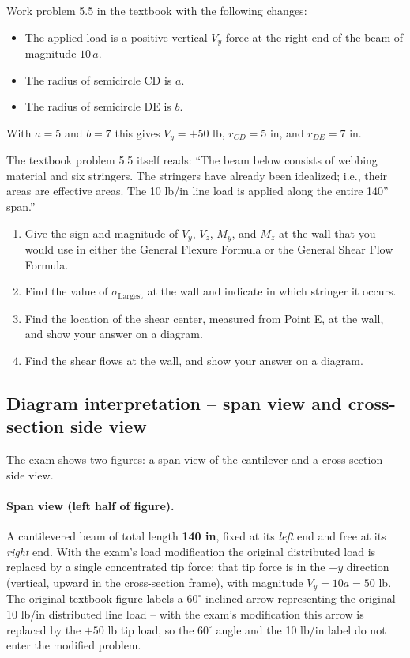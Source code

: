 \documentclass[11pt]{article}
\begin{document}
\begin{problembox}
Work problem 5.5 in the textbook with the following changes:
\begin{itemize}[leftmargin=2em, itemsep=2pt]
  \item The applied load is a positive vertical $V_y$ force at the right end of the beam of magnitude $10\,a$.
  \item The radius of semicircle CD is $a$.
  \item The radius of semicircle DE is $b$.
\end{itemize}
With $a = 5$ and $b = 7$ this gives $V_y = +50$ lb, $r_{CD} = 5$ in, and $r_{DE} = 7$ in.

The textbook problem 5.5 itself reads: ``The beam below consists of webbing material and six stringers. The stringers have already been idealized; i.e., their areas are effective areas. The 10 lb/in line load is applied along the entire 140'' span.''
\begin{enumerate}[label=(\alph*), leftmargin=2em, itemsep=2pt]
  \item Give the sign and magnitude of $V_y$, $V_z$, $M_y$, and $M_z$ at the wall that you would use in either the General Flexure Formula or the General Shear Flow Formula.
  \item Find the value of $\sigma_{\text{Largest}}$ at the wall and indicate in which stringer it occurs.
  \item Find the location of the shear center, measured from Point E, at the wall, and show your answer on a diagram.
  \item Find the shear flows at the wall, and show your answer on a diagram.
\end{enumerate}
\end{problembox}

\subsection*{Diagram interpretation -- span view and cross-section side view}

The exam shows two figures: a span view of the cantilever and a cross-section side view.

\paragraph{Span view (left half of figure).}
A cantilevered beam of total length \textbf{140 in}, fixed at its \emph{left} end and free at its \emph{right} end. With the exam's load modification the original distributed load is replaced by a single concentrated tip force; that tip force is in the $+y$ direction (vertical, upward in the cross-section frame), with magnitude $V_y = 10a = 50$ lb. The original textbook figure labels a $60^\circ$ inclined arrow representing the original 10 lb/in distributed line load -- with the exam's modification this arrow is replaced by the $+50$ lb tip load, so the $60^\circ$ angle and the 10 lb/in label do not enter the modified problem.
\end{document}
